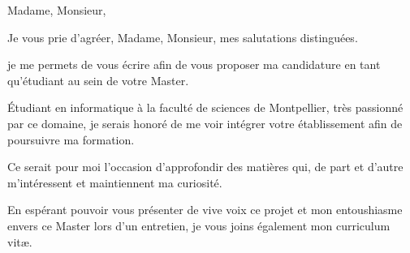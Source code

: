 \documentclass[11pt,a4paper,sans]{moderncv}        %
\begin{document}
\date{9 février 2017}
\opening{Madame, Monsieur,}
\closing{Je vous prie d'agréer, Madame, Monsieur, mes salutations distinguées.}
\makelettertitle


je me permets de vous écrire afin de vous proposer ma candidature en tant qu’étudiant au sein de
votre Master.

Étudiant en informatique à la faculté de sciences de Montpellier, très passionné par ce domaine, je serais honoré de me voir intégrer votre établissement afin de poursuivre ma formation.

Ce serait pour moi l’occasion d’approfondir des matières qui, de part et d’autre m’intéressent et maintiennent ma curiosité.

En espérant pouvoir vous présenter de vive voix ce projet et mon entoushiasme envers ce Master lors d’un entretien, je vous joins également mon curriculum vitæ.


\makeletterclosing

\end{document}
